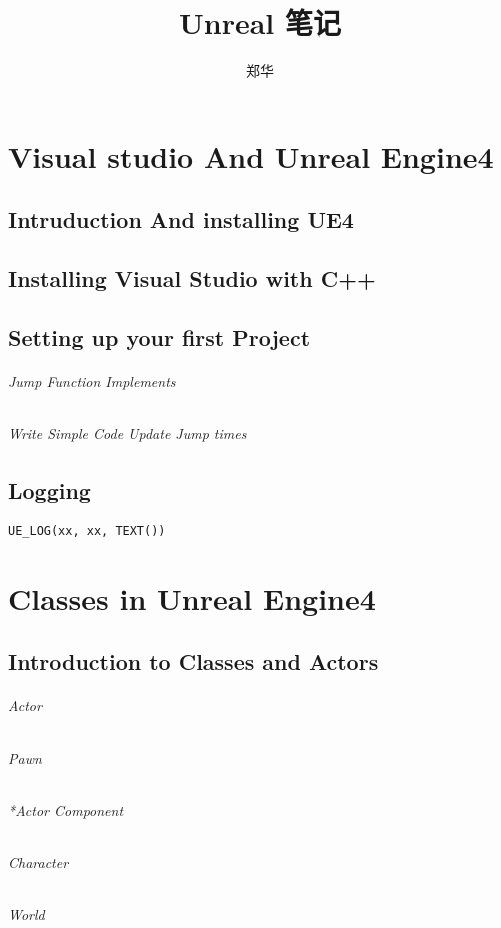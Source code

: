 \documentclass[UTF8,a4paper,12pt]{ctexbook}
\author{\kaishu 郑华}
\title{\heiti Unreal 笔记}
\begin{document}
 	\maketitle
 	\tableofcontents
 	
 
 

\chapter{Visual studio And Unreal Engine4}
	\section{Intruduction And installing UE4}
		
	\section{Installing Visual Studio with C++}
		
	\section{Setting up your first Project}
		\subparagraph{Jump Function Implements}
						
		\subparagraph{Write Simple Code Update Jump times}
	
	\section{Logging}
		
			\verb|UE_LOG(xx, xx, TEXT())|	
	
	
\chapter{Classes in Unreal Engine4}
	\section{Introduction to Classes and Actors}
		\subparagraph{Actor}
			
		\subparagraph{Pawn}
			
		\subparagraph{*Actor Component}
			
		\subparagraph{Character}
		
		\subparagraph{World}
			
			
\end{document}
